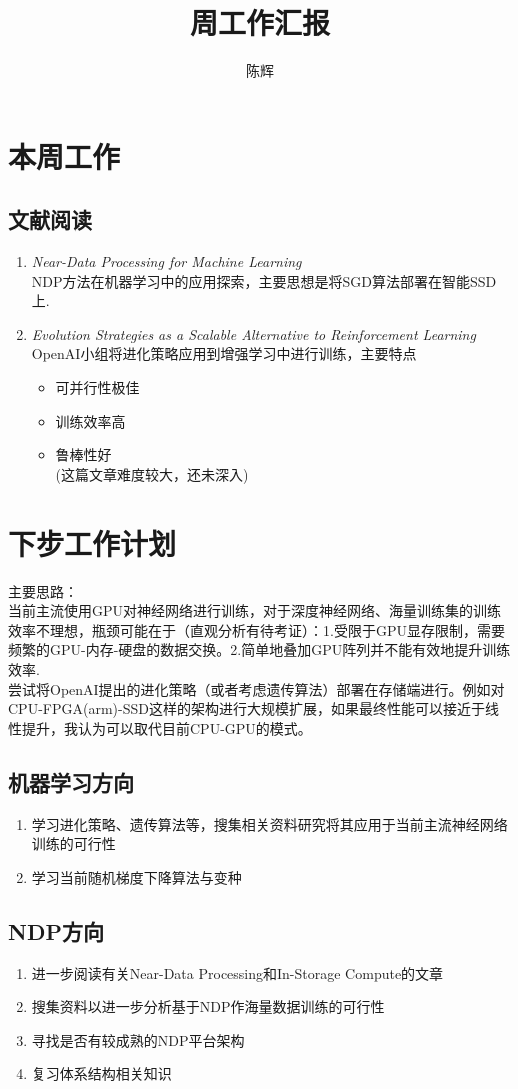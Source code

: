 \documentclass{article}
\title{\vspace{-4cm}周工作汇报}
\author{陈辉}
\begin{document}
\maketitle
\section{本周工作}
\subsection*{文献阅读}
\begin{enumerate}
\item \textit{Near-Data Processing for Machine Learning}\\
NDP方法在机器学习中的应用探索，主要思想是将SGD算法部署在智能SSD上.
\item \textit{Evolution Strategies as a Scalable Alternative to Reinforcement Learning}\\
OpenAI小组将进化策略应用到增强学习中进行训练，主要特点
\begin{itemize}
\item 可并行性极佳
\item 训练效率高
\item 鲁棒性好
\\
(这篇文章难度较大，还未深入)

\end{itemize}

\end{enumerate}
\section{下步工作计划}
主要思路：\\
当前主流使用GPU对神经网络进行训练，对于深度神经网络、海量训练集的训练效率不理想，瓶颈可能在于（直观分析有待考证）：1.受限于GPU显存限制，需要频繁的GPU-内存-硬盘的数据交换。2.简单地叠加GPU阵列并不能有效地提升训练效率.\\
尝试将OpenAI提出的进化策略（或者考虑遗传算法）部署在存储端进行。例如对CPU-FPGA(arm)-SSD这样的架构进行大规模扩展，如果最终性能可以接近于线性提升，我认为可以取代目前CPU-GPU的模式。

\subsection{机器学习方向}
\begin{enumerate}
\item 学习进化策略、遗传算法等，搜集相关资料研究将其应用于当前主流神经网络训练的可行性
\item 学习当前随机梯度下降算法与变种 
\end{enumerate}

\subsection{NDP方向}
\begin{enumerate}
\item 进一步阅读有关Near-Data Processing和In-Storage Compute的文章
\item 搜集资料以进一步分析基于NDP作海量数据训练的可行性
\item 寻找是否有较成熟的NDP平台架构
\item 复习体系结构相关知识
\end{enumerate}
%
\end{document}
